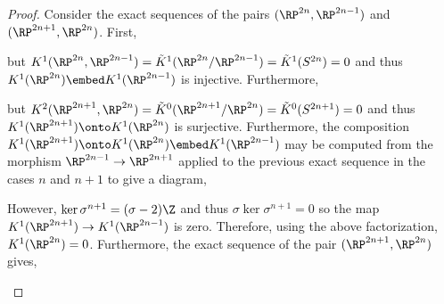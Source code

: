 \documentclass[12pt]{extarticle}
\begin{document}
\begin{proof}
Consider the exact sequences of the pairs $(\RP^{2n}, \RP^{2n - 1})$ and $(\RP^{2n + 1}, \RP^{2n})$. First,
\begin{center}
\end{center}
but $K^1(\RP^{2n}, \RP^{2n - 1}) = \tilde{K}^1(\RP^{2n} / \RP^{2n - 1}) = \tilde{K}^1(S^{2n}) = 0$ and thus $K^1(\RP^{2n}) \embed K^1(\RP^{2n - 1})$ is injective. Furthermore,
\begin{center}
\end{center}
but $K^2(\RP^{2n + 1}, \RP^{2n}) = \tilde{K}^0( \RP^{2n + 1} / \RP^{2n}) = \tilde{K}^0(S^{2n + 1}) = 0$
and thus $K^1(\RP^{2n + 1}) \onto K^1(\RP^{2n})$ is surjective. Furthermore, the composition $K^1(\RP^{2n + 1}) \onto K^1(\RP^{2n}) \embed K^1(\RP^{2n - 1})$ may be computed from the morphism $\RP^{2n - 1} \to \RP^{2n + 1}$ applied to the previous exact sequence in the cases $n$ and $n + 1$ to give a diagram,
\begin{center}
\end{center}
However, $\ker{\sigma^{n+1}} = (\sigma - 2) \Z$ and thus $\sigma \ker{\sigma^{n+1}} = 0$ so the map $K^1(\RP^{2n + 1}) \to K^1(\RP^{2n - 1})$ is zero. Therefore, using the above factorization, $K^1(\RP^{2n}) = 0$. Furthermore, the exact sequence of the pair $(\RP^{2n + 1}, \RP^{2n})$ gives,
\begin{center}
\end{center}

\end{proof}
\end{document}
